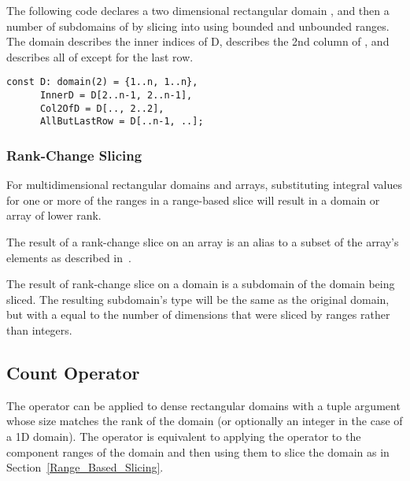 \begin{example}
The following code declares a two dimensional rectangular
domain , and then a number of subdomains of  by
slicing into  using bounded and unbounded ranges.
The  domain describes the inner indices of
D,  describes the 2nd column of
, and  describes all of  except
for the last row.

\begin{chapel}
\begin{verbatim}
const D: domain(2) = {1..n, 1..n},
      InnerD = D[2..n-1, 2..n-1],
      Col2OfD = D[.., 2..2],
      AllButLastRow = D[..n-1, ..];
\end{verbatim}
\end{chapel}
\end{example}

\subsubsection{Rank-Change Slicing}
\label{Rank_Change_Slicing}

For multidimensional rectangular domains and arrays, substituting
integral values for one or more of the ranges in a range-based slice
will result in a domain or array of lower rank.

The result of a rank-change slice on an array is an alias to a subset
of the array's elements as described
in~.

The result of rank-change slice on a domain is a subdomain of the
domain being sliced.  The resulting
subdomain's type will be the same as the original domain, but with
a  equal to the number of dimensions that were sliced by
ranges rather than integers.


\subsection{Count Operator}
\label{Count_Operator_Domains}
The \chpl{\#} operator can be applied to dense rectangular domains with
a tuple argument whose size matches the rank of the domain (or
optionally an integer in the case of a 1D domain).  The operator is
equivalent to applying the \chpl{\#} operator to the component ranges
of the domain and then using them to slice the domain as in
Section~\ref{Range_Based_Slicing}.


